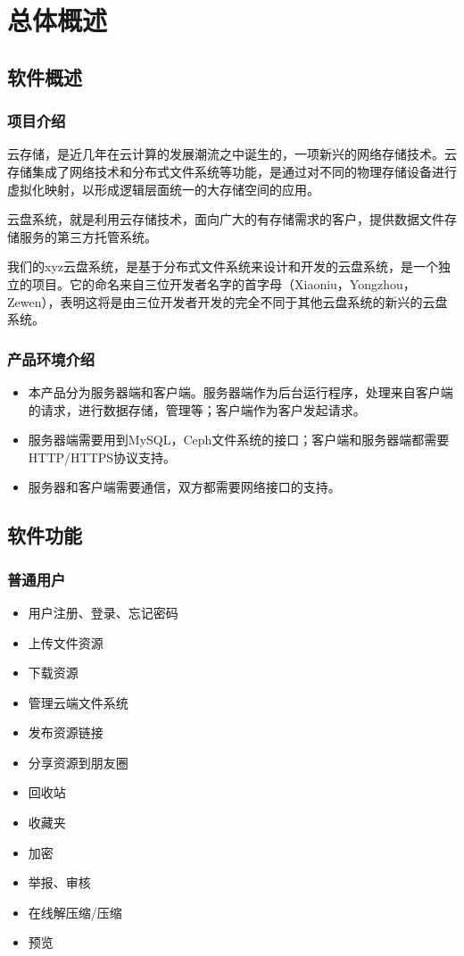 \chapter{总体概述}

\section{软件概述}
\subsection{项目介绍}
云存储，是近几年在云计算的发展潮流之中诞生的，一项新兴的网络存储技术。云存储集成了网络技术和分布式文件系统等功能，是通过对不同的物理存储设备进行虚拟化映射，以形成逻辑层面统一的大存储空间的应用。

云盘系统，就是利用云存储技术，面向广大的有存储需求的客户，提供数据文件存储服务的第三方托管系统。

我们的xyz云盘系统，是基于分布式文件系统来设计和开发的云盘系统，是一个独立的项目。它的命名来自三位开发者名字的首字母（Xiaoniu，Yongzhou，Zewen），表明这将是由三位开发者开发的完全不同于其他云盘系统的新兴的云盘系统。

\subsection{产品环境介绍}

\begin{itemize}
	\item 本产品分为服务器端和客户端。服务器端作为后台运行程序，处理来自客户端的请求，进行数据存储，管理等；客户端作为客户发起请求。
	\item 服务器端需要用到MySQL，Ceph文件系统的接口；客户端和服务器端都需要HTTP/HTTPS协议支持。
	\item 服务器和客户端需要通信，双方都需要网络接口的支持。
\end{itemize}
\section{软件功能}

\subsection{普通用户}
\begin{itemize}
	\item 用户注册、登录、忘记密码
	\item 上传文件资源
	\item 下载资源
	\item 管理云端文件系统
	\item 发布资源链接
	\item 分享资源到朋友圈
	\item 回收站
	\item 收藏夹
	\item 加密
	\item 举报、审核
	\item 在线解压缩/压缩
	\item 预览
\end{itemize}

